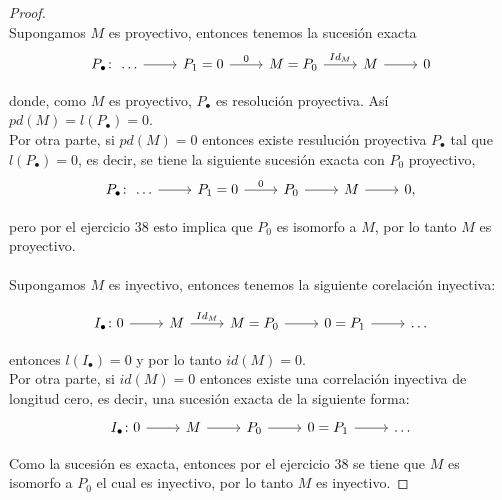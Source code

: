 \documentclass{article}
\begin{document}
\begin{enumerate}[label=\textbf{Ej \arabic*.}]
\begin{proof}
\\
Supongamos $M$ es proyectivo, entonces tenemos la sucesión exacta 
\[
\begin{tikzcd}
 P_\bullet \colon\,\ldots\arrow{r}{} & P_1=0 \arrow{r}{0}& M=P_0 \arrow{r}{Id_M} & M\arrow{r}{} &0
\end{tikzcd}
\]

donde, como $M$ es proyectivo, $P_\bullet$ es resolución proyectiva. Así \\ $pd(M)=l(P_\bullet)=0$.\\

Por otra parte, si $pd(M)=0$ entonces existe resulución proyectiva $P_\bullet$ tal que $l(P_\bullet)=0$, es decir, se tiene la siguiente 
sucesión exacta con $P_0$ proyectivo,
\[
\begin{tikzcd}
 P_\bullet \colon\,\ldots\arrow{r}{} & P_1=0 \arrow{r}{0}& P_0 \arrow{r}{} & M\arrow{r}{} &0,
\end{tikzcd}
\]

pero por el ejercicio 38 esto implica que $P_0$ es isomorfo a $M$, por lo tanto $M$ es proyectivo.\\
\\
Supongamos $M$ es inyectivo, entonces tenemos la siguiente corelación inyectiva:

\[
\begin{tikzcd}
 I_\bullet \colon 0\arrow{r}{} & M \arrow{r}{Id_M} & M=P_0\arrow{r}{} &0=P_1\arrow{r}{}&\ldots
\end{tikzcd}
\]

entonces $l( I_\bullet)=0$ y por lo tanto $id(M)=0.$\\

Por otra parte, si $id(M)=0$ entonces existe una correlación inyectiva de longitud cero, es decir, una sucesión exacta de la siguiente forma:
\[
\begin{tikzcd}
 I_\bullet \colon 0\arrow{r}{} & M \arrow{r}{} & P_0\arrow{r}{} &0=P_1\arrow{r}{}&\ldots
\end{tikzcd}
\]

Como la sucesión es exacta, entonces por el ejercicio 38 se tiene que $M$ es isomorfo a $P_0$ el cual es inyectivo, por lo tanto $M$ es inyectivo.
\end{proof}

\end{enumerate}
\end{document}
